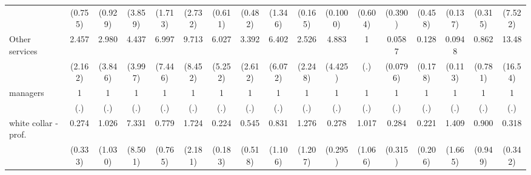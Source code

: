 {\begin{tabular}{l*{16}{c}}
                    &     (0.755)         &     (0.929)         &     (3.859)         &     (1.713)         &     (2.732)         &     (0.611)         &     (0.482)         &     (1.346)         &     (0.165)         &    (0.1000)         &     (0.604)         &     (0.390)         &     (0.458)         &     (0.137)         &     (0.315)         &     (7.522)         \\
[1em]
Other services      &       2.457         &       2.980         &       4.437         &       6.997         &       9.713\sym{**} &       6.027\sym{*}  &       3.392         &       6.402         &       2.526         &       4.883         &           1         &      0.0587\sym{*}  &       0.128         &      0.0948\sym{*}  &       0.862         &       13.48\sym{*}  \\
                    &     (2.162)         &     (3.846)         &     (3.997)         &     (7.446)         &     (8.452)         &     (5.252)         &     (2.612)         &     (6.072)         &     (2.248)         &     (4.425)         &         (.)         &    (0.0796)         &     (0.178)         &     (0.113)         &     (0.781)         &     (16.54)         \\
[1em]
managers            &           1         &           1         &           1         &           1         &           1         &           1         &           1         &           1         &           1         &           1         &           1         &           1         &           1         &           1         &           1         &           1         \\
                    &         (.)         &         (.)         &         (.)         &         (.)         &         (.)         &         (.)         &         (.)         &         (.)         &         (.)         &         (.)         &         (.)         &         (.)         &         (.)         &         (.)         &         (.)         &         (.)         \\
[1em]
white collar - prof.&       0.274         &       1.026         &       7.331         &       0.779         &       1.724         &       0.224         &       0.545         &       0.831         &       1.276         &       0.278         &       1.017         &       0.284         &       0.221         &       1.409         &       0.900         &       0.318         \\
                    &     (0.333)         &     (1.030)         &     (8.501)         &     (0.765)         &     (2.181)         &     (0.183)         &     (0.518)         &     (1.106)         &     (1.207)         &     (0.295)         &     (1.066)         &     (0.315)         &     (0.206)         &     (1.665)         &     (0.949)         &     (0.342)         \\

\end{tabular}}
